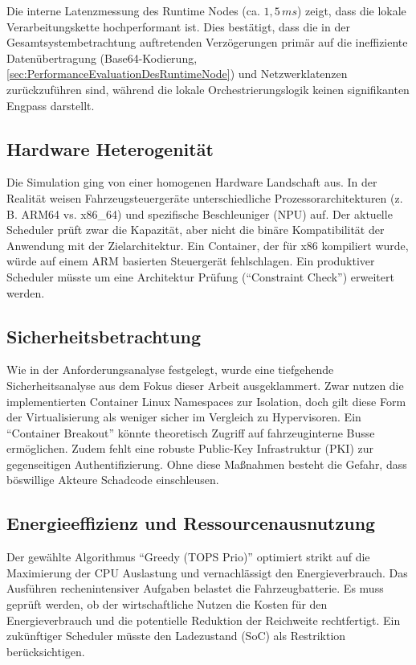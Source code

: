 Die interne Latenzmessung des Runtime Nodes (ca. $1,5\,ms$) zeigt, dass die lokale Verarbeitungskette hochperformant ist. Dies bestätigt, dass die in der Gesamtsystembetrachtung auftretenden Verzögerungen primär auf die ineffiziente Datenübertragung (Base64-Kodierung, \autoref{sec:PerformanceEvaluationDesRuntimeNode}) und Netzwerklatenzen zurückzuführen sind, während die lokale Orchestrierungslogik keinen signifikanten Engpass darstellt.

\subsection{Hardware Heterogenität}
Die Simulation ging von einer homogenen Hardware Landschaft aus. In der Realität weisen Fahrzeugsteuergeräte unterschiedliche Prozessorarchitekturen (z.\,B. ARM64 vs. x86\_64) und spezifische Beschleuniger (NPU) auf. Der aktuelle Scheduler prüft zwar die Kapazität, aber nicht die binäre Kompatibilität der Anwendung mit der Zielarchitektur. Ein Container, der für x86 kompiliert wurde, würde auf einem ARM basierten Steuergerät fehlschlagen. Ein produktiver Scheduler müsste um eine Architektur Prüfung (\enquote{Constraint Check}) erweitert werden.

\subsection{Sicherheitsbetrachtung}
Wie in der Anforderungsanalyse festgelegt, wurde eine tiefgehende Sicherheitsanalyse aus dem Fokus dieser Arbeit ausgeklammert. Zwar nutzen die implementierten Container Linux Namespaces zur Isolation, doch gilt diese Form der Virtualisierung als weniger sicher im Vergleich zu Hypervisoren. Ein \enquote{Container Breakout} könnte theoretisch Zugriff auf fahrzeuginterne Busse ermöglichen. Zudem fehlt eine robuste Public-Key Infrastruktur (PKI) zur gegenseitigen Authentifizierung. Ohne diese Maßnahmen besteht die Gefahr, dass böswillige Akteure Schadcode einschleusen.

\subsection{Energieeffizienz und Ressourcenausnutzung}
Der gewählte Algorithmus \enquote{Greedy (TOPS Prio)} optimiert strikt auf die Maximierung der CPU Auslastung und vernachlässigt den Energieverbrauch. Das Ausführen rechenintensiver Aufgaben belastet die Fahrzeugbatterie. Es muss geprüft werden, ob der wirtschaftliche Nutzen die Kosten für den Energieverbrauch und die potentielle Reduktion der Reichweite rechtfertigt. Ein zukünftiger Scheduler müsste den Ladezustand (SoC) als Restriktion berücksichtigen.

